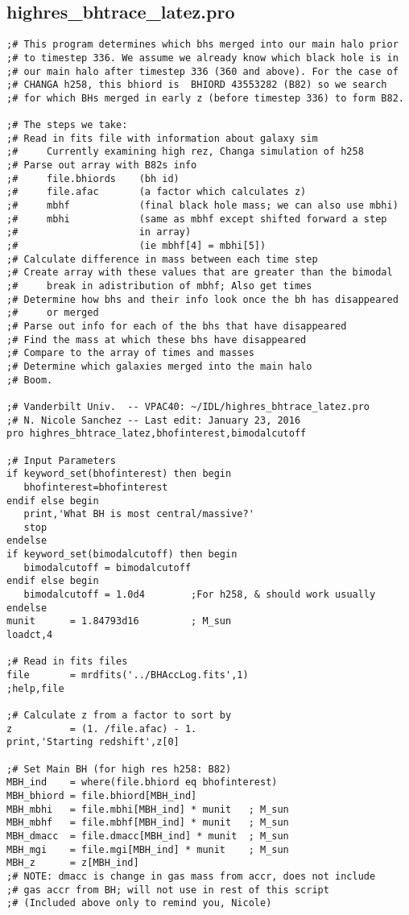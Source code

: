 \documentclass[12pt,headA,chapB]{fiskthesis}
\begin{document}
\subsection{highres\_bhtrace\_latez.pro}
\begin{verbatim}
;# This program determines which bhs merged into our main halo prior
;# to timestep 336. We assume we already know which black hole is in
;# our main halo after timestep 336 (360 and above). For the case of 
;# CHANGA h258, this bhiord is  BHIORD 43553282 (B82) so we search 
;# for which BHs merged in early z (before timestep 336) to form B82.

;# The steps we take:
;# Read in fits file with information about galaxy sim
;#     Currently examining high rez, Changa simulation of h258
;# Parse out array with B82s info
;#     file.bhiords    (bh id)
;#     file.afac       (a factor which calculates z)
;#     mbhf            (final black hole mass; we can also use mbhi)
;#     mbhi            (same as mbhf except shifted forward a step 
;#                     in array)
;#                     (ie mbhf[4] = mbhi[5])
;# Calculate difference in mass between each time step
;# Create array with these values that are greater than the bimodal 
;#     break in adistribution of mbhf; Also get times
;# Determine how bhs and their info look once the bh has disappeared
;#     or merged
;# Parse out info for each of the bhs that have disappeared
;# Find the mass at which these bhs have disappeared
;# Compare to the array of times and masses
;# Determine which galaxies merged into the main halo
;# Boom.

;# Vanderbilt Univ.  -- VPAC40: ~/IDL/highres_bhtrace_latez.pro
;# N. Nicole Sanchez -- Last edit: January 23, 2016
pro highres_bhtrace_latez,bhofinterest,bimodalcutoff

;# Input Parameters
if keyword_set(bhofinterest) then begin
   bhofinterest=bhofinterest  
endif else begin
   print,'What BH is most central/massive?' 
   stop
endelse
if keyword_set(bimodalcutoff) then begin
   bimodalcutoff = bimodalcutoff 
endif else begin
   bimodalcutoff = 1.0d4        ;For h258, & should work usually
endelse
munit      = 1.84793d16         ; M_sun
loadct,4

;# Read in fits files
file       = mrdfits('../BHAccLog.fits',1)
;help,file

;# Calculate z from a factor to sort by
z          = (1. /file.afac) - 1.
print,'Starting redshift',z[0]

;# Set Main BH (for high res h258: B82)
MBH_ind    = where(file.bhiord eq bhofinterest) 
MBH_bhiord = file.bhiord[MBH_ind]
MBH_mbhi   = file.mbhi[MBH_ind] * munit   ; M_sun
MBH_mbhf   = file.mbhf[MBH_ind] * munit   ; M_sun
MBH_dmacc  = file.dmacc[MBH_ind] * munit  ; M_sun
MBH_mgi    = file.mgi[MBH_ind] * munit    ; M_sun
MBH_z      = z[MBH_ind]
;# NOTE: dmacc is change in gas mass from accr, does not include 
;# gas accr from BH; will not use in rest of this script
;# (Included above only to remind you, Nicole)


\end{verbatim}
\end{document}
